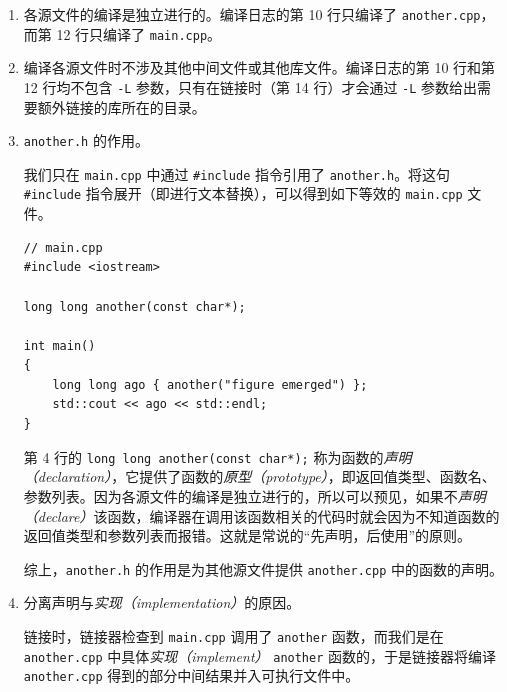 \begin{enumerate}
	\item 各源文件的编译是独立进行的。编译日志的第 10 行只编译了 \lstinline[language={}]{another.cpp}，而第 12 行只编译了 \lstinline[language={}]{main.cpp}。

	\item 编译各源文件时不涉及其他中间文件或其他库文件。编译日志的第 10 行和第 12 行均不包含 \lstinline[language={}]{-L} 参数，只有在链接时（第 14 行）才会通过 \lstinline[language={}]{-L} 参数给出需要额外链接的库所在的目录。

	\item \lstinline[language={}]{another.h} 的作用。

	我们只在 \lstinline[language={}]{main.cpp} 中通过 \lstinline[language={[17]C++}]{#include} 指令引用了 \lstinline[language={}]{another.h}。将这句 \lstinline[language={[17]C++}]{#include} 指令展开（即进行文本替换），可以得到如下等效的 \lstinline[language={}]{main.cpp} 文件。

	\begin{lstlisting}[language={[17]C++}, moreemph={[2]another}]
// main.cpp
#include <iostream>

long long another(const char*);

int main()
{
	long long ago { another("figure emerged") };
	std::cout << ago << std::endl;
}
	\end{lstlisting}

	第 4 行的 \lstinline[language={[17]C++}, moreemph={[2]another}]{long long another(const char*);} 称为函数的\emph{声明（declaration）}，它提供了函数的\emph{原型（prototype）}，即返回值类型、函数名、参数列表。因为各源文件的编译是独立进行的，所以可以预见，如果不\emph{声明（declare）}该函数，编译器在调用该函数相关的代码时就会因为不知道函数的返回值类型和参数列表而报错。这就是常说的“先声明，后使用”的原则。

	综上，\lstinline[language={}]{another.h} 的作用是为其他源文件提供 \lstinline[language={}]{another.cpp} 中的函数的声明。

	\item 分离声明与\emph{实现（implementation）}的原因。

	链接时，链接器检查到 \lstinline[language={}]{main.cpp} 调用了 \lstinline[language={[17]C++}, moreemph={[2]another}]{another} 函数，而我们是在 \lstinline[language={}]{another.cpp} 中具体\emph{实现（implement）} \lstinline[language={[17]C++}, moreemph={[2]another}]{another} 函数的，于是链接器将编译 \lstinline[language={}]{another.cpp} 得到的部分中间结果并入可执行文件中。


\end{enumerate}
